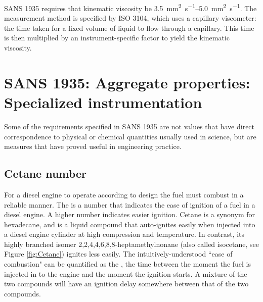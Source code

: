 SANS 1935 requires that kinematic viscosity be
\SIrange{3.5}{5.0}{\milli\metre\squared\per\second}. The measurement method is
specified by ISO 3104, which uses a capillary viscometer: the time taken for a
fixed volume of liquid to flow through a capillary. This time is then multiplied
by an instrument-specific factor to yield the kinematic viscosity.

\section[SANS 1935: Aggregate properties: Specialized in\-stru\-mentation]{SANS
1935: Aggregate properties: \\ Specialized in\-stru\-mentation}

Some of the requirements specified in SANS 1935 are not values that have direct
correspondence to physical or chemical quantities usually used in science, but
are measures that have proved useful in engineering practice.

\subsection{Cetane number}

For a diesel engine to operate according to design the fuel must combust in a
reliable manner. The  is a number that indicates the ease
of ignition of a fuel in a diesel engine. A higher number indicates easier
ignition. Cetane is a synonym for hexadecane, and is a liquid compound that
auto-ignites easily when injected into a diesel engine cylinder at high
compression and temperature. In contrast, its highly branched isomer
2,2,4,4,6,8,8-heptamethylnonane (also called isocetane, see Figure
\ref{fig:Cetane}) ignites less easily. The intuitively-understood ``ease of
combustion" can be quantified as the , the time between
the moment the fuel is injected in to the engine and the moment the ignition
starts. A mixture of the two compounds will have an ignition delay somewhere
between that of the two compounds.

